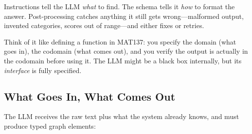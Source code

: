 \documentclass[11pt, letterpaper]{article}
\begin{document}
Instructions tell the LLM \emph{what} to find. The schema tells it \emph{how} to format the answer. Post-processing catches anything it still gets wrong---malformed output, invented categories, scores out of range---and either fixes or retries.

\begin{intuition}
Think of it like defining a function in MAT137: you specify the domain (what goes in), the codomain (what comes out), and you verify the output is actually in the codomain before using it. The LLM might be a black box internally, but its \emph{interface} is fully specified.
\end{intuition}

\subsection{What Goes In, What Comes Out}

The LLM receives the raw text plus what the system already knows, and must produce typed graph elements:
\end{document}
